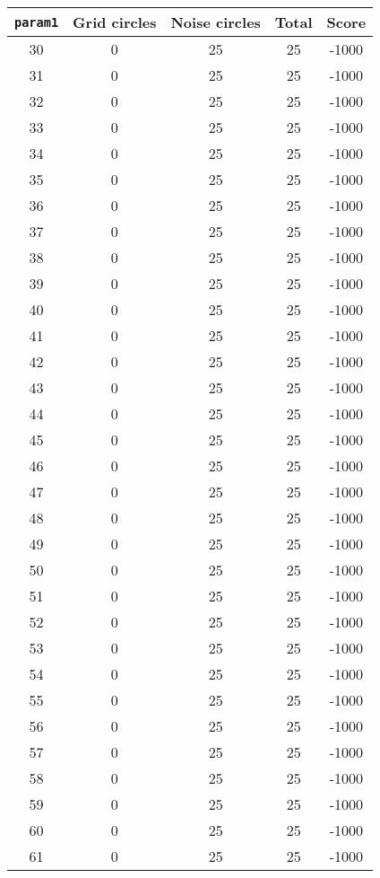 \documentclass[letterpaper, 12pt]{article}
\begin{document}
\begin{longtable}{|c|c|c|c|c|}
\hline
\textbf{\texttt{param1}} & \textbf{Grid circles} & \textbf{Noise circles} & \textbf{Total} & \textbf{Score} \\
\hline
30 & 0 & 25 & 25 & -1000 \\
\hline
31 & 0 & 25 & 25 & -1000 \\
\hline
32 & 0 & 25 & 25 & -1000 \\
\hline
33 & 0 & 25 & 25 & -1000 \\
\hline
34 & 0 & 25 & 25 & -1000 \\
\hline
35 & 0 & 25 & 25 & -1000 \\
\hline
36 & 0 & 25 & 25 & -1000 \\
\hline
37 & 0 & 25 & 25 & -1000 \\
\hline
38 & 0 & 25 & 25 & -1000 \\
\hline
39 & 0 & 25 & 25 & -1000 \\
\hline
40 & 0 & 25 & 25 & -1000 \\
\hline
41 & 0 & 25 & 25 & -1000 \\
\hline
42 & 0 & 25 & 25 & -1000 \\
\hline
43 & 0 & 25 & 25 & -1000 \\
\hline
44 & 0 & 25 & 25 & -1000 \\
\hline
45 & 0 & 25 & 25 & -1000 \\
\hline
46 & 0 & 25 & 25 & -1000 \\
\hline
47 & 0 & 25 & 25 & -1000 \\
\hline
48 & 0 & 25 & 25 & -1000 \\
\hline
49 & 0 & 25 & 25 & -1000 \\
\hline
50 & 0 & 25 & 25 & -1000 \\
\hline
51 & 0 & 25 & 25 & -1000 \\
\hline
52 & 0 & 25 & 25 & -1000 \\
\hline
53 & 0 & 25 & 25 & -1000 \\
\hline
54 & 0 & 25 & 25 & -1000 \\
\hline
55 & 0 & 25 & 25 & -1000 \\
\hline
56 & 0 & 25 & 25 & -1000 \\
\hline
57 & 0 & 25 & 25 & -1000 \\
\hline
58 & 0 & 25 & 25 & -1000 \\
\hline
59 & 0 & 25 & 25 & -1000 \\
\hline
60 & 0 & 25 & 25 & -1000 \\
\hline
61 & 0 & 25 & 25 & -1000 \\

\end{longtable}
\end{document}
